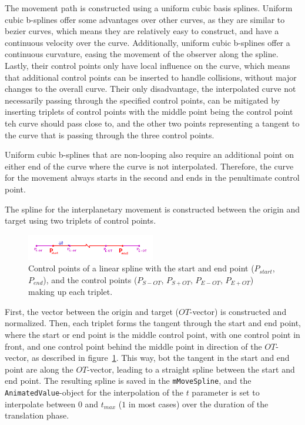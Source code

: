 The movement path is constructed using a uniform cubic basis splines.
Uniform cubic b-splines offer some advantages over other curves, as they are similar to bezier curves, which means
they are relatively easy to construct, and have a continuous velocity over the curve.
Additionally, uniform cubic b-splines offer a continuous curvature, easing the movement of the observer along the
spline.
Lastly, their control points only have local influence on the curve, which means that additional control points can
be inserted to handle collisions, without major changes to the overall curve.
Their only disadvantage, the interpolated curve not necessarily passing through the specified control points, can be
mitigated by inserting triplets of control points with the middle point being the control point teh curve should pass
close to, and the other two points representing a tangent to the curve that is passing through the three control points.

Uniform cubic b-splines that are non-looping also require an additional point on either end of the curve where the
curve is not interpolated.
Therefore, the curve for the movement always starts in the second and ends in the penultimate control point.

The spline for the interplanetary movement is constructed between the origin and target using two triplets of control
points.

\begin{figure}[h]
    \centering
    \includegraphics[width=0.5\textwidth]{content/4_3_autoNavigation/img/LinearSplinePoints}
    \caption{Control points of a linear spline with the start and end point ($P_{start}$, $P_{end}$), and the control
    points ($P_{S-OT}$, $P_{S+OT}$, $P_{E-OT}$, $P_{E+OT}$) making up each triplet.}
    \label{fig:linear-control-points}
\end{figure}

First, the vector between the origin and target ($OT$-vector) is constructed and normalized.
Then, each triplet forms the tangent through the start and end point, where the start or end point is the middle
control point, with one control point in front, and one control point behind the middle point in direction of the
$OT$-vector, as described in figure~\ref{fig:linear-control-points}.
This way, bot the tangent in the start and end point are along the $OT$-vector, leading to a straight spline between
the start and end point.
The resulting spline is saved in the \texttt{mMoveSpline}, and the \texttt{AnimatedValue}-object for the
interpolation of the $t$ parameter is set to interpolate between $0$ and $t_{max}$ ($1$ in most cases) over the
duration of the translation phase.

